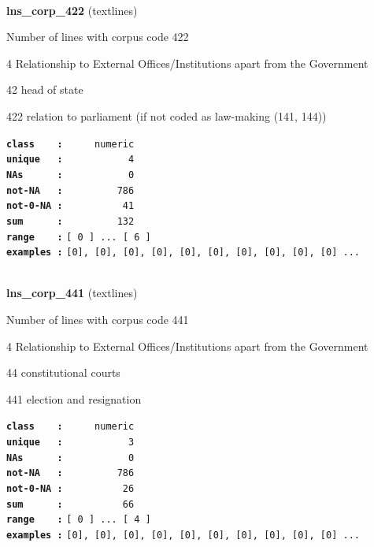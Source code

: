 \documentclass[]{article}
\begin{document}
~

\textbf{lns\_corp\_422} (textlines)

Number of lines with corpus code 422

4 Relationship to External Offices/Institutions apart from the
Government

42 head of state

422 relation to parliament (if not coded as law-making (141, 144))

\textbf{\texttt{class\ \ \ \ :}} \texttt{~~~~~numeric}\\
\textbf{\texttt{unique\ \ \ :}} \texttt{~~~~~~~~~~~4}\\
\textbf{\texttt{NAs\ \ \ \ \ \ :}} \texttt{~~~~~~~~~~~0}\\
\textbf{\texttt{not-NA\ \ \ :}} \texttt{~~~~~~~~~786}\\
\textbf{\texttt{not-0-NA\ :}} \texttt{~~~~~~~~~~41}\\
\textbf{\texttt{sum\ \ \ \ \ \ :}} \texttt{~~~~~~~~~132}\\
\textbf{\texttt{range\ \ \ \ :}}
\texttt{{[}\ 0\ {]}\ ...\ {[}\ 6\ {]}}\\
\textbf{\texttt{examples\ :}}
\texttt{{[}0{]},\ {[}0{]},\ {[}0{]},\ {[}0{]},\ {[}0{]},\ {[}0{]},\ {[}0{]},\ {[}0{]},\ {[}0{]},\ {[}0{]}\ ...}\\

~

\textbf{lns\_corp\_441} (textlines)

Number of lines with corpus code 441

4 Relationship to External Offices/Institutions apart from the
Government

44 constitutional courts

441 election and resignation

\textbf{\texttt{class\ \ \ \ :}} \texttt{~~~~~numeric}\\
\textbf{\texttt{unique\ \ \ :}} \texttt{~~~~~~~~~~~3}\\
\textbf{\texttt{NAs\ \ \ \ \ \ :}} \texttt{~~~~~~~~~~~0}\\
\textbf{\texttt{not-NA\ \ \ :}} \texttt{~~~~~~~~~786}\\
\textbf{\texttt{not-0-NA\ :}} \texttt{~~~~~~~~~~26}\\
\textbf{\texttt{sum\ \ \ \ \ \ :}} \texttt{~~~~~~~~~~66}\\
\textbf{\texttt{range\ \ \ \ :}}
\texttt{{[}\ 0\ {]}\ ...\ {[}\ 4\ {]}}\\
\textbf{\texttt{examples\ :}}
\texttt{{[}0{]},\ {[}0{]},\ {[}0{]},\ {[}0{]},\ {[}0{]},\ {[}0{]},\ {[}0{]},\ {[}0{]},\ {[}0{]},\ {[}0{]}\ ...}\\
\end{document}
